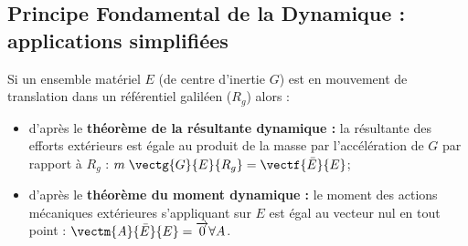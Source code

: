 %
%		


\subsection[PFD : applications simplifiées]{Principe Fondamental de la Dynamique : applications simplifiées}


\begin{defi}
Si un ensemble matériel $E$ (de centre d'inertie $G$) est en mouvement de translation dans un référentiel galiléen ($R_g$) alors : 

\begin{itemize}
\item d'après le \textbf{théorème de la résultante dynamique : } la résultante des efforts extérieurs est égale au produit de la masse par l'accélération de $G$ par rapport à $R_g$ :
$
m\;\vectg{G}{E}{R_g}=\vectf{\bar E}{E}$;%
\item d'après le \textbf{théorème du moment dynamique : } le moment des actions mécaniques extérieures s'appliquant sur $E$ est égal au vecteur nul en tout point :
$\vectm{A}{\bar E}{E}=\overrightarrow{0}\forall  A$.
\end{itemize}

\end{defi}
 



